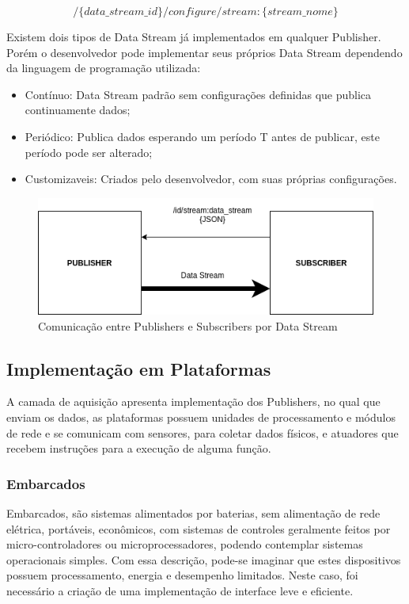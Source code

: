 $$ /\{data\_stream\_id\}/configure/stream:\{stream\_nome\} $$

Existem dois tipos de Data Stream já implementados em qualquer Publisher. Porém o desenvolvedor pode implementar seus próprios Data Stream dependendo da linguagem de programação utilizada:

\begin{itemize}
\item Contínuo: Data Stream padrão sem configurações definidas que publica continuamente dados;
\item Periódico: Publica dados esperando um período T antes de publicar, este período pode ser alterado;
\item Customizaveis: Criados pelo desenvolvedor, com suas próprias configurações.
\end{itemize}


\begin{figure}[h!]
\centering
\includegraphics[width=12cm]{./02_Capitulos/02_Cap3/figures/publisher-subscriber_comm}
\caption{Comunicação entre Publishers e Subscribers por Data Stream}
\label{fig:3.2.0/pub_sub}
\end{figure}


\subsection{Implementação em Plataformas}
\label{subsection:plataformas}

A camada de aquisição apresenta implementação dos Publishers, no qual que enviam os dados, as plataformas possuem unidades de processamento e módulos de rede e se comunicam com sensores, para coletar dados físicos, e atuadores que recebem instruções para a execução de alguma função.

\subsubsection{Embarcados}
\label{subsubsection:embarcados}

Embarcados, são sistemas alimentados por baterias, sem alimentação de rede elétrica, portáveis, econômicos, com sistemas de controles geralmente feitos por micro-controladores ou microprocessadores, podendo contemplar sistemas operacionais simples. Com essa descrição, pode-se imaginar que estes dispositivos possuem processamento, energia e desempenho limitados. Neste caso, foi necessário a criação de uma implementação de interface leve e eficiente.

